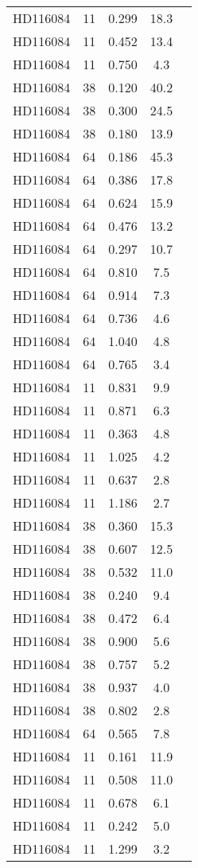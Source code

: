 \begin{table*}
\begin{tabular}{l c c c c}
HD116084 & 11 & 0.299 & 18.3\\ 
HD116084 & 11 & 0.452 & 13.4\\ 
HD116084 & 11 & 0.750 & 4.3\\ 
HD116084 & 38 & 0.120 & 40.2\\ 
HD116084 & 38 & 0.300 & 24.5\\ 
HD116084 & 38 & 0.180 & 13.9\\ 
HD116084 & 64 & 0.186 & 45.3\\ 
HD116084 & 64 & 0.386 & 17.8\\ 
HD116084 & 64 & 0.624 & 15.9\\ 
HD116084 & 64 & 0.476 & 13.2\\ 
HD116084 & 64 & 0.297 & 10.7\\ 
HD116084 & 64 & 0.810 & 7.5\\ 
HD116084 & 64 & 0.914 & 7.3\\ 
HD116084 & 64 & 0.736 & 4.6\\ 
HD116084 & 64 & 1.040 & 4.8\\ 
HD116084 & 64 & 0.765 & 3.4\\ 
HD116084 & 11 & 0.831 & 9.9\\ 
HD116084 & 11 & 0.871 & 6.3\\ 
HD116084 & 11 & 0.363 & 4.8\\ 
HD116084 & 11 & 1.025 & 4.2\\ 
HD116084 & 11 & 0.637 & 2.8\\ 
HD116084 & 11 & 1.186 & 2.7\\ 
HD116084 & 38 & 0.360 & 15.3\\ 
HD116084 & 38 & 0.607 & 12.5\\ 
HD116084 & 38 & 0.532 & 11.0\\ 
HD116084 & 38 & 0.240 & 9.4\\ 
HD116084 & 38 & 0.472 & 6.4\\ 
HD116084 & 38 & 0.900 & 5.6\\ 
HD116084 & 38 & 0.757 & 5.2\\ 
HD116084 & 38 & 0.937 & 4.0\\ 
HD116084 & 38 & 0.802 & 2.8\\ 
HD116084 & 64 & 0.565 & 7.8\\ 
HD116084 & 11 & 0.161 & 11.9\\ 
HD116084 & 11 & 0.508 & 11.0\\ 
HD116084 & 11 & 0.678 & 6.1\\ 
HD116084 & 11 & 0.242 & 5.0\\ 
HD116084 & 11 & 1.299 & 3.2\\ 

\end{tabular}
\end{table*}
